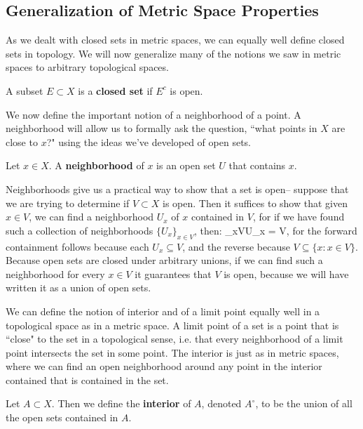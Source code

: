 	\subsection{Generalization of Metric Space Properties}
	
	As we dealt with closed sets in metric spaces, we can equally well define closed sets in topology. We will now generalize many of the notions we saw in metric 
	spaces to arbitrary topological spaces.
	
	\begin{definition}
		A subset $E\subset X$ is a \textbf{closed set} if $E^c$ is open.
	\end{definition}
	
	We now define the important notion of a neighborhood of a point. A neighborhood will allow us to formally ask the question, ``what points in $X$ are close to $x$?" using the ideas we've developed of open sets. 
	\newline
	\begin{definition}[Neighborhood]
		Let $x\in X$. A \textbf{neighborhood} of $x$ is an open set $U$ that contains $x$.
	\end{definition}
	
	Neighborhoods give us a practical way to show that a set is open-- suppose that we are trying to determine if $V\subset X$ is open. Then it suffices to show 
	that given $x\in V$, we can find a neighborhood $U_x$ of $x$ contained in $V$, for if we have found such a collection of neighborhoods $\{U_x\}_{x\in V}$, 
	then:
	\eq
		\bigcup_{x\in V}U_x = V,
	\qe
	for the forward containment follows because each $U_x\subseteq V$, and the reverse because $V\subseteq\{x : x\in V\}$. Because open sets are closed 
	under arbitrary unions, if we can find such a neighborhood for every $x\in V$ it guarantees that $V$ is open, because we will have written it as a union 
	of open sets.

	We can define the notion of interior and of a limit point equally well in a topological space as in a metric space. A limit point of a set is a point that is ``close" to 
	the set in a topological sense, i.e. that every neighborhood of a limit point intersects the set in some point. The interior is just as in metric spaces, where we 
	can find an open neighborhood around any point in the interior contained that is contained in the set.
	
	\begin{definition}[Interior]
		Let $A\subset X$. Then we define the \textbf{interior} of $A$, denoted $A^\circ$, to be the union of all the open sets contained in $A$.
	\end{definition}
	
